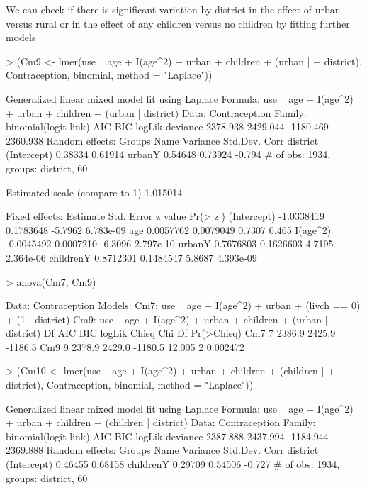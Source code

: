 \documentclass[12pt]{article}
\begin{document}
We can check if there is significant variation by district in the
effect of urban versus rural or in the effect of any children versus
no children by fitting further models
\begin{Schunk}
\begin{Sinput}
> (Cm9 <- lmer(use ~ age + I(age^2) + urban + children + (urban | 
+     district), Contraception, binomial, method = "Laplace"))
\end{Sinput}
\begin{Soutput}
Generalized linear mixed model fit using Laplace 
Formula: use ~ age + I(age^2) + urban + children + (urban | district) 
   Data: Contraception 
 Family: binomial(logit link)
      AIC      BIC    logLik deviance
 2378.938 2429.044 -1180.469 2360.938
Random effects:
 Groups   Name        Variance Std.Dev. Corr   
 district (Intercept) 0.38334  0.61914         
          urbanY      0.54648  0.73924  -0.794 
# of obs: 1934, groups: district, 60

Estimated scale (compare to 1)  1.015014 

Fixed effects:
              Estimate Std. Error z value  Pr(>|z|)
(Intercept) -1.0338419  0.1783648 -5.7962 6.783e-09
age          0.0057762  0.0079049  0.7307     0.465
I(age^2)    -0.0045492  0.0007210 -6.3096 2.797e-10
urbanY       0.7676803  0.1626603  4.7195 2.364e-06
childrenY    0.8712301  0.1484547  5.8687 4.393e-09
\end{Soutput}
\begin{Sinput}
> anova(Cm7, Cm9)
\end{Sinput}
\begin{Soutput}
Data: Contraception
Models:
Cm7: use ~ age + I(age^2) + urban + (livch == 0) + (1 | district)
Cm9: use ~ age + I(age^2) + urban + children + (urban | district)
    Df     AIC     BIC  logLik  Chisq Chi Df Pr(>Chisq)
Cm7  7  2386.9  2425.9 -1186.5                         
Cm9  9  2378.9  2429.0 -1180.5 12.005      2   0.002472
\end{Soutput}
\begin{Sinput}
> (Cm10 <- lmer(use ~ age + I(age^2) + urban + children + (children | 
+     district), Contraception, binomial, method = "Laplace"))
\end{Sinput}
\begin{Soutput}
Generalized linear mixed model fit using Laplace 
Formula: use ~ age + I(age^2) + urban + children + (children | district) 
   Data: Contraception 
 Family: binomial(logit link)
      AIC      BIC    logLik deviance
 2387.888 2437.994 -1184.944 2369.888
Random effects:
 Groups   Name        Variance Std.Dev. Corr   
 district (Intercept) 0.46455  0.68158         
          childrenY   0.29709  0.54506  -0.727 
# of obs: 1934, groups: district, 60


\end{Soutput}
\end{Schunk}
\end{document}
